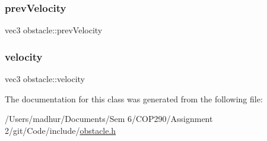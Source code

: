 \mbox{\label{classobstacle_adf95e00ffb6277989021978958775acd}} 
\subsubsection{\texorpdfstring{prev\+Velocity}{prevVelocity}}
{\footnotesize\ttfamily vec3 obstacle\+::prev\+Velocity\hspace{0.3cm}{\ttfamily [private]}}

\mbox{\label{classobstacle_a4c1053819a6cfdecfdb9903224154b5a}} 
\subsubsection{\texorpdfstring{velocity}{velocity}}
{\footnotesize\ttfamily vec3 obstacle\+::velocity\hspace{0.3cm}{\ttfamily [private]}}



The documentation for this class was generated from the following file\+:\begin{DoxyCompactItemize}
\item 
/\+Users/madhur/\+Documents/\+Sem 6/\+C\+O\+P290/\+Assignment 2/git/\+Code/include/\mbox{\hyperlink{obstacle_8h}{obstacle.\+h}}\end{DoxyCompactItemize}
